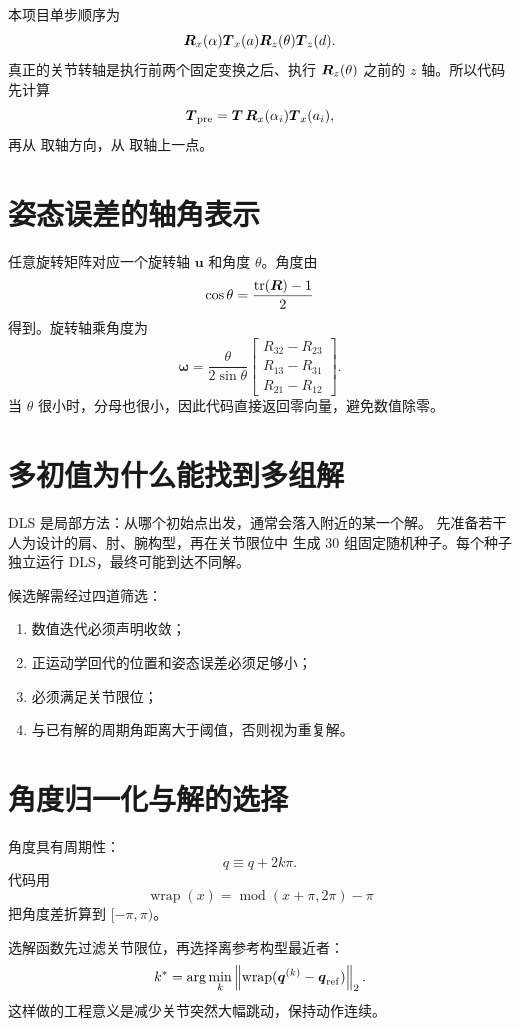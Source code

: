 本项目单步顺序为
\[
\boldsymbol{R}_x(\alpha)\boldsymbol{T}_x(a)\boldsymbol{R}_z(\theta)\boldsymbol{T}_z(d).
\]
真正的关节转轴是执行前两个固定变换之后、执行 $\boldsymbol{R}_z(\theta)$ 之前的
$z$ 轴。所以代码先计算
\[
\boldsymbol{T}_{\mathrm{pre}}=
\boldsymbol{T}\,\boldsymbol{R}_x(\alpha_i)\boldsymbol{T}_x(a_i),
\]
再从  取轴方向，从
 取轴上一点。

\section{姿态误差的轴角表示}

任意旋转矩阵对应一个旋转轴 $\boldsymbol{u}$ 和角度 $\theta$。角度由
\[
\cos\theta=\frac{\operatorname{tr}(\boldsymbol{R})-1}{2}
\]
得到。旋转轴乘角度为
\[
\boldsymbol{\omega}=
\frac{\theta}{2\sin\theta}
\begin{bmatrix}
R_{32}-R_{23}\\
R_{13}-R_{31}\\
R_{21}-R_{12}
\end{bmatrix}.
\]
当 $\theta$ 很小时，分母也很小，因此代码直接返回零向量，避免数值除零。

\section{多初值为什么能找到多组解}

DLS 是局部方法：从哪个初始点出发，通常会落入附近的某一个解。
 先准备若干人为设计的肩、肘、腕构型，再在关节限位中
生成 30 组固定随机种子。每个种子独立运行 DLS，最终可能到达不同解。

候选解需经过四道筛选：

\begin{enumerate}
  \item 数值迭代必须声明收敛；
  \item 正运动学回代的位置和姿态误差必须足够小；
  \item 必须满足关节限位；
  \item 与已有解的周期角距离大于阈值，否则视为重复解。
\end{enumerate}

\section{角度归一化与解的选择}

角度具有周期性：
\[
q\equiv q+2k\pi.
\]
代码用
\[
\operatorname{wrap}(x)=\operatorname{mod}(x+\pi,2\pi)-\pi
\]
把角度差折算到 $[-\pi,\pi)$。

选解函数先过滤关节限位，再选择离参考构型最近者：
\[
k^*=\arg\min_k
\left\lVert \operatorname{wrap}(\boldsymbol{q}^{(k)}-\boldsymbol{q}_{\mathrm{ref}})\right\rVert_2.
\]
这样做的工程意义是减少关节突然大幅跳动，保持动作连续。


